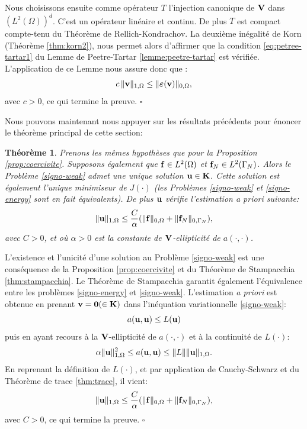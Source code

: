 \documentclass[11pt]{book}
\newtheorem{theorem}{Théorème}[section]
\newcommand{\bt}{\begin{theorem}}
\newcommand{\et}{\end{theorem}}
\newcommand{\cqfd}{{$\mbox{}$\hfill$\square$}}
\def\u{{\bf u}}
\def\f{{\bf f}}
\def\vv{{\bf v}}
\def\V{{\bf V}}
\def\K{{\bf K}}
\def\0{{\bf 0}}
\newcommand{\e}{\mbox{\boldmath{$\varepsilon$}}}
\begin{document}
Nous choisissons ensuite comme opérateur $T$ l'injection canonique de $\V$ dans $(L^2(\Omega))^d$. C'est un opérateur linéaire et continu. De plus $T$ est compact compte-tenu du Théorème de Rellich-Kondrachov. %
La deuxième inégalité de Korn
(Théorème \ref{thm:korn2}), nous permet alors d'affirmer que la 
condition \ref{eq:petree-tartar1} du Lemme de Peetre-Tartar \ref{lemme:peetre-tartar} est vérifiée.
L'application de ce Lemme nous assure donc que :
 \[
 c \, \| \vv \|_{1,\Omega} \leq \| \e(\vv) \|_{0,\Omega},
 \]
avec $c > 0$, ce qui termine la preuve.
\cqfd
 
\medskip
 
Nous pouvons maintenant nous appuyer sur les résultats précédents pour énoncer le théorème principal de cette section:

\bt Prenons les mêmes hypothèses que pour la Proposition \ref{prop:coercivite}. Supposons également que $\f \in L^2(\Omega)$ et $\f_N \in L^2(\Gamma_N)$.
Alors le Problème \eqref{signo-weak} admet une unique solution $\u \in \K$. Cette solution est également l'unique minimiseur de $J(\cdot)$ (les Problèmes \eqref{signo-weak} et \eqref{signo-energy} sont en fait équivalents). De plus $\u$ vérifie l'estimation \emph{a priori} suivante:
  \[
  \| \u \|_{1,\Omega} \leq \frac{C}\alpha ( \| \f \|_{0,\Omega} + \| \f_N \|_{0,\Gamma_N} ),
  \]
avec $C>0$, et où $\alpha > 0$ est la constante de $\V$-ellipticité de $a(\cdot,\cdot)$.
\et

\proof 
L'existence et l'unicité d'une solution au Problème \eqref{signo-weak} est une conséquence de la Proposition \ref{prop:coercivite} et du Théorème de Stampacchia \ref{thm:stampacchia}. 
Le Théorème de Stampacchia garantit également l'équivalence entre les problèmes \eqref{signo-energy} et \eqref{signo-weak}.
L'estimation {\it a priori} est obtenue en prenant $\vv = \0 (\in \K)$ dans l'inéquation variationnelle \eqref{signo-weak}:
 \[
 a(\u,\u) \leq L(\u)
 \]
puis en ayant recours à la $\V$-ellipticité de $a(\cdot,\cdot)$ et à la continuité de $L(\cdot)$:
  \[
  \alpha \| \u \|^2_{1,\Omega} \leq a(\u,\u) \leq \| L \| \| \u \|_{1,\Omega}.
  \]
En reprenant la définition de $L(\cdot)$, et par application de Cauchy-Schwarz et du Théorème de trace \ref{thm:trace}, il vient:
  \[
  \| \u \|_{1,\Omega} \leq \frac{C}\alpha ( \| \f \|_{0,\Omega} + \| \f_N \|_{0,\Gamma_N} ),
  \]
avec $C>0$, ce qui termine la preuve.
\cqfd
 
\end{document}
